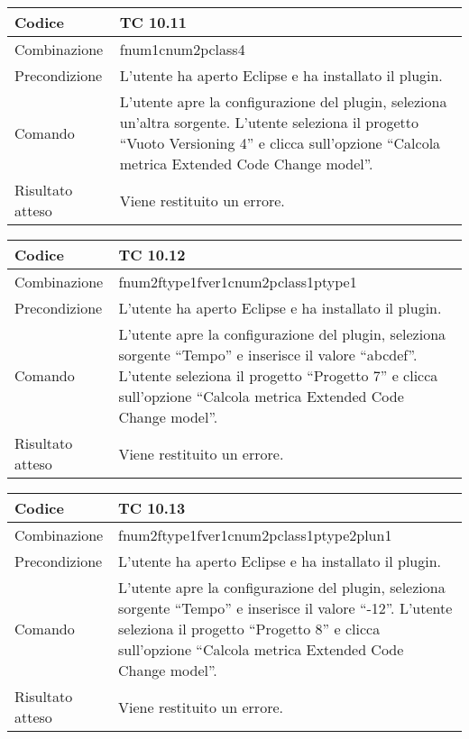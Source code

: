 \begin{table}[ht]
\begin{tabular}{|p{3cm}|p{9cm}|}
\hline
\cellcolor{lightgray}Codice				& TC 10.11								\\
\hline
\cellcolor{lightgray}Combinazione		& fnum1cnum2pclass4									\\
\hline
\cellcolor{lightgray}Precondizione		& L'utente ha aperto Eclipse e ha installato il plugin.		\\
\hline
\cellcolor{lightgray}Comando			& L'utente apre la configurazione del plugin, seleziona un'altra sorgente. L'utente seleziona il progetto ``Vuoto Versioning 4''  e clicca sull'opzione ``Calcola metrica Extended Code Change model''.	\\
\hline
\cellcolor{lightgray}Risultato atteso	& Viene restituito un errore.\\
\hline
\end{tabular}
\end{table}

\begin{table}[ht]
\begin{tabular}{|p{3cm}|p{9cm}|}
\hline
\cellcolor{lightgray}Codice				& TC 10.12								\\
\hline
\cellcolor{lightgray}Combinazione		& fnum2ftype1fver1cnum2pclass1ptype1									\\
\hline
\cellcolor{lightgray}Precondizione		& L'utente ha aperto Eclipse e ha installato il plugin.		\\
\hline
\cellcolor{lightgray}Comando			& L'utente apre la configurazione del plugin, seleziona sorgente ``Tempo'' e inserisce il valore ``abcdef''. L'utente seleziona il progetto ``Progetto 7''  e clicca sull'opzione ``Calcola metrica Extended Code Change model''.	\\
\hline
\cellcolor{lightgray}Risultato atteso	& Viene restituito un errore.\\
\hline
\end{tabular}
\end{table}



\begin{table}[ht]
\begin{tabular}{|p{3cm}|p{9cm}|}
\hline
\cellcolor{lightgray}Codice				& TC 10.13								\\
\hline
\cellcolor{lightgray}Combinazione		& fnum2ftype1fver1cnum2pclass1ptype2plun1									\\
\hline
\cellcolor{lightgray}Precondizione		& L'utente ha aperto Eclipse e ha installato il plugin.		\\
\hline
\cellcolor{lightgray}Comando			& L'utente apre la configurazione del plugin, seleziona sorgente ``Tempo'' e inserisce il valore ``-12''. L'utente seleziona il progetto ``Progetto 8''  e clicca sull'opzione ``Calcola metrica Extended Code Change model''.	\\
\hline
\cellcolor{lightgray}Risultato atteso	& Viene restituito un errore.\\
\hline
\end{tabular}
\end{table}

